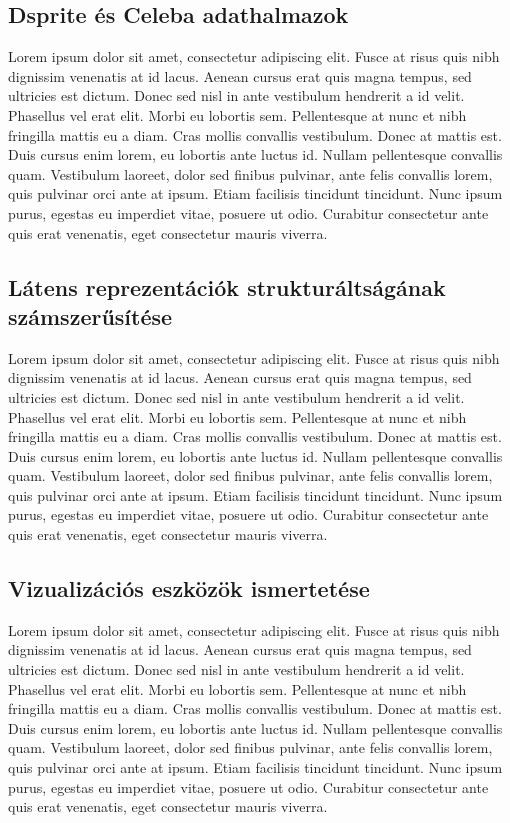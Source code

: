 \documentclass[12pt]{article}
\begin{document}
\subsection{Dsprite és Celeba adathalmazok}

Lorem ipsum dolor sit amet, consectetur adipiscing elit. Fusce at risus quis nibh dignissim venenatis at id lacus. Aenean cursus erat quis magna tempus, sed ultricies est dictum. Donec sed nisl in ante vestibulum hendrerit a id velit. Phasellus vel erat elit. Morbi eu lobortis sem. Pellentesque at nunc et nibh fringilla mattis eu a diam. Cras mollis convallis vestibulum. Donec at mattis est. Duis cursus enim lorem, eu lobortis ante luctus id. Nullam pellentesque convallis quam. Vestibulum laoreet, dolor sed finibus pulvinar, ante felis convallis lorem, quis pulvinar orci ante at ipsum. Etiam facilisis tincidunt tincidunt. Nunc ipsum purus, egestas eu imperdiet vitae, posuere ut odio. Curabitur consectetur ante quis erat venenatis, eget consectetur mauris viverra.

\subsection{Látens reprezentációk strukturáltságának számszerűsítése}

Lorem ipsum dolor sit amet, consectetur adipiscing elit. Fusce at risus quis nibh dignissim venenatis at id lacus. Aenean cursus erat quis magna tempus, sed ultricies est dictum. Donec sed nisl in ante vestibulum hendrerit a id velit. Phasellus vel erat elit. Morbi eu lobortis sem. Pellentesque at nunc et nibh fringilla mattis eu a diam. Cras mollis convallis vestibulum. Donec at mattis est. Duis cursus enim lorem, eu lobortis ante luctus id. Nullam pellentesque convallis quam. Vestibulum laoreet, dolor sed finibus pulvinar, ante felis convallis lorem, quis pulvinar orci ante at ipsum. Etiam facilisis tincidunt tincidunt. Nunc ipsum purus, egestas eu imperdiet vitae, posuere ut odio. Curabitur consectetur ante quis erat venenatis, eget consectetur mauris viverra.

\subsection{Vizualizációs eszközök ismertetése}

Lorem ipsum dolor sit amet, consectetur adipiscing elit. Fusce at risus quis nibh dignissim venenatis at id lacus. Aenean cursus erat quis magna tempus, sed ultricies est dictum. Donec sed nisl in ante vestibulum hendrerit a id velit. Phasellus vel erat elit. Morbi eu lobortis sem. Pellentesque at nunc et nibh fringilla mattis eu a diam. Cras mollis convallis vestibulum. Donec at mattis est. Duis cursus enim lorem, eu lobortis ante luctus id. Nullam pellentesque convallis quam. Vestibulum laoreet, dolor sed finibus pulvinar, ante felis convallis lorem, quis pulvinar orci ante at ipsum. Etiam facilisis tincidunt tincidunt. Nunc ipsum purus, egestas eu imperdiet vitae, posuere ut odio. Curabitur consectetur ante quis erat venenatis, eget consectetur mauris viverra.
\end{document}
